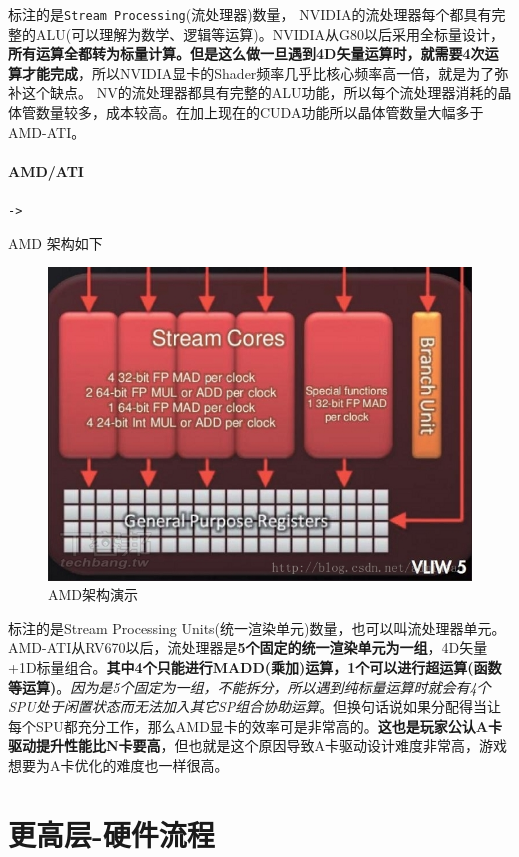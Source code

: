 \documentclass[UTF8,a4paper,12pt]{ctexbook}
\begin{document}
				标注的是\verb|Stream Processing|(流处理器)数量， 
				NVIDIA的流处理器每个都具有完整的ALU(可以理解为数学、逻辑等运算)。NVIDIA从G80以后采用全标量设计，\textbf{所有运算全都转为标量计算。但是这么做一旦遇到4D矢量运算时，就需要4次运算才能完成}，所以NVIDIA显卡的Shader频率几乎比核心频率高一倍，就是为了弥补这个缺点。 
				NV的流处理器都具有完整的ALU功能，所以每个流处理器消耗的晶体管数量较多，成本较高。在加上现在的CUDA功能所以晶体管数量大幅多于AMD-ATI。
				
			\paragraph{AMD/ATI}\verb|->|
				
				AMD 架构如下
				\begin{figure}[H]
					\centering
					\includegraphics[scale=0.5]{AMD}
					\caption{AMD架构演示}
				\end{figure}			
			
				标注的是Stream Processing Units(统一渲染单元)数量，也可以叫流处理器单元。 
				AMD-ATI从RV670以后，流处理器是\textbf{5个固定的统一渲染单元为一组}，4D矢量+1D标量组合。\textbf{其中4个只能进行MADD(乘加)运算，1个可以进行超运算(函数等运算)}。\textit{因为是5个固定为一组，不能拆分，所以遇到纯标量运算时就会有4个SPU处于闲置状态而无法加入其它SP组合协助运算}。但换句话说如果分配得当让每个SPU都充分工作，那么AMD显卡的效率可是非常高的。\textbf{这也是玩家公认A卡驱动提升性能比N卡要高}，但也就是这个原因导致A卡驱动设计难度非常高，游戏想要为A卡优化的难度也一样很高。 
				
	\section{更高层-硬件流程}
\end{document}
